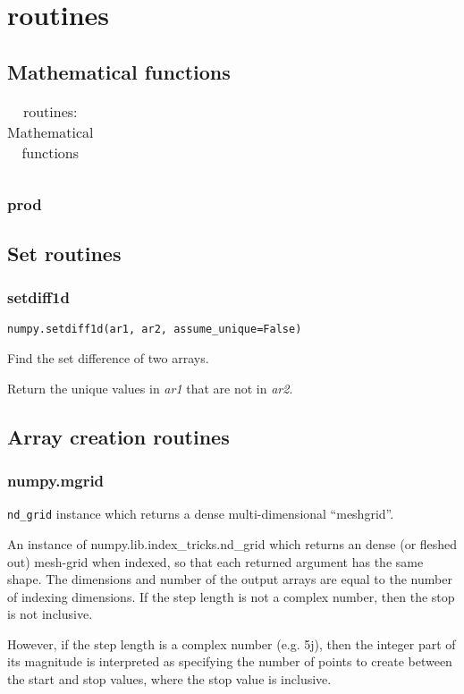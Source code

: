 \chapter{routines\label{routines}}
\section{Mathematical functions}
\begin{table}
    \centering
    \caption{routines: Mathematical functions}
    \begin{tabular}{ll}
        \hline
        \nameref{prod} & \nameref{setdiff1d} \\
        \hline
    \end{tabular}
\end{table}
\subsection{prod\label{prod}}
\section{Set routines}
\subsection{setdiff1d\label{setdiff1d}}
\verb|numpy.setdiff1d(ar1, ar2, assume_unique=False)|

Find the set difference of two arrays.

Return the unique values in \textit{ar1} that are not in \textit{ar2}.

\section{Array creation routines}
\subsection{numpy.mgrid}
\verb|nd_grid| instance which returns a dense multi-dimensional “meshgrid”.

An instance of numpy.lib.index_tricks.nd_grid which returns an dense (or fleshed out) mesh-grid when indexed, so that each returned argument has the same shape. The dimensions and number of the output arrays are equal to the number of indexing dimensions. If the step length is not a complex number, then the stop is not inclusive.

However, if the step length is a complex number (e.g. 5j), then the integer part of its magnitude is interpreted as specifying the number of points to create between the start and stop values, where the stop value is inclusive.